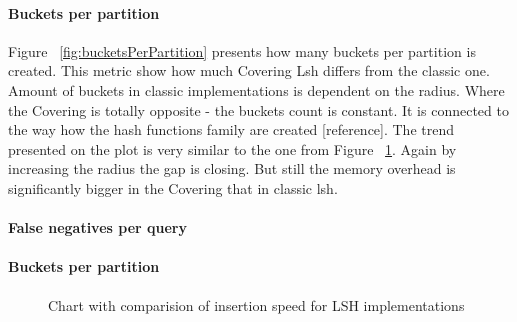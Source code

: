 \paragraph{Buckets per partition}

Figure ~\ref{fig:bucketsPerPartition} presents how many buckets per partition is created. This metric show
how much Covering Lsh differs from the classic one. Amount of buckets in classic
implementations is dependent on the radius. Where the Covering is totally
opposite - the buckets count is constant. It is connected to the way how the
hash functions family are created [reference]. The trend presented on the plot
is very similar to the one from Figure ~\ref{fig:insertionsPerSecondPlot}. Again by increasing the radius the
gap is closing. But still the memory overhead is significantly bigger in the
Covering that in classic lsh.

\paragraph{False negatives per query}

\paragraph{Buckets per partition}

\begin{figure}[ht]
\label{fig:insertionsPerSecondPlot}
\caption{Chart with comparision of insertion speed for LSH implementations}
\end{figure}


